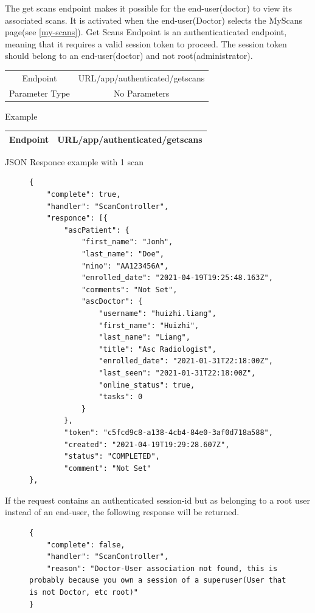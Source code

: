 					The get scans endpoint makes it possible for the end-user(doctor) to view its associated scans. It is activated 
					when the end-user(Doctor) selects the MyScans page(see \ref{my-scans}). Get Scans Endpoint is an authenticaticated endpoint, meaning 
					that it requires a valid session token to proceed. The session token should belong to an end-user(doctor) and 
					not root(administrator).
					\begin{center}
						\begin{tabular}{ |c|c| } 
							\hline
							Endpoint & {{URL}}/app/authenticated/getscans\\
							Parameter Type & No Parameters  \\
							\hline
						\end{tabular}
					\end{center}
					Example
					\begin{center}
						\begin{tabular}{ |c|c| } 
							\hline
							Endpoint & {{URL}}/app/authenticated/getscans\\
							\hline
						\end{tabular}
					\end{center}
					JSON Responce example with 1 scan
					\begin{figure}[H]
						\iftrue
						\begin{lstlisting}[]
{
	"complete": true,
	"handler": "ScanController",
	"responce": [{
		"ascPatient": {
			"first_name": "Jonh",
			"last_name": "Doe",
			"nino": "AA123456A",
			"enrolled_date": "2021-04-19T19:25:48.163Z",
			"comments": "Not Set",
			"ascDoctor": {
				"username": "huizhi.liang",
				"first_name": "Huizhi",
				"last_name": "Liang",
				"title": "Asc Radiologist",
				"enrolled_date": "2021-01-31T22:18:00Z",
				"last_seen": "2021-01-31T22:18:00Z",
				"online_status": true,
				"tasks": 0
			}
		},
		"token": "c5fcd9c8-a138-4cb4-84e0-3af0d718a588",
		"created": "2021-04-19T19:29:28.607Z",
		"status": "COMPLETED",
		"comment": "Not Set"
},
						\end{lstlisting}
					\end{figure}
					If the request contains an authenticated session-id but as belonging to a root user instead of an end-user, the following response will be returned.
					\begin{figure}[H]
						\iftrue
						\begin{lstlisting}[]
{	
	"complete": false,
	"handler": "ScanController",
	"reason": "Doctor-User association not found, this is probably because you own a session of a superuser(User that is not Doctor, etc root)"
}
						\end{lstlisting}
					\end{figure}
